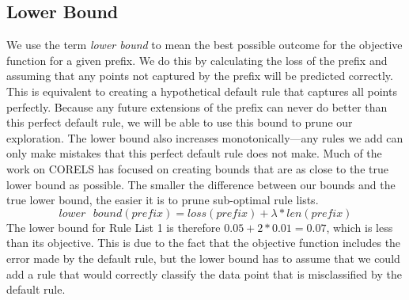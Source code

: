 \subsection{Lower Bound}
We use the term \textit{lower bound} to mean the best possible outcome for the objective function for a given prefix.
We do this by calculating the loss of the prefix and assuming that any points not captured by the prefix will be predicted correctly.
This is equivalent to creating a hypothetical default rule that captures all points perfectly.
Because any future extensions of the prefix can never do better than this perfect default rule, we will be able to use this bound to prune our exploration.
The lower bound also increases monotonically---any rules we add can only make mistakes that this perfect default rule does not make.
Much of the work on CORELS has focused on creating bounds that are as close to the true lower bound as possible.
The smaller the difference between our bounds and the true lower bound, the easier it is to prune sub-optimal rule lists. 
$$lower \text{ } bound(prefix) = loss(prefix) + \lambda * len(prefix)$$
The lower bound for Rule List 1 is therefore $0.05 + 2 * 0.01 = 0.07$, which is less than its objective.
This is due to the fact that the objective function includes the error made by the default rule, but the lower bound has to assume that we could add a rule that would correctly classify the data point that is misclassified by the default rule.

